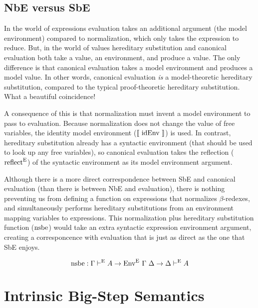 \documentclass{llncs}
\newcommand{\refsec}[1]{Section \ref{sec:#1}}
\def\marr{\rightarrow}
\def\reflecte{\fun{reflect}^\con{E}}
\def\nsbe{\fun{nsbe}}
\def\midenv{\el{\fun{idEnv}}}
\newcommand{\turn}[1]{\vdash^\con{#1}}
\newcommand{\el}[1]{\llbracket ~ #1 ~ \rrbracket}
\newcommand{\con}[1]{\textmd{#1}}
\newcommand{\fun}[1]{\textmd{#1}}
\newcommand{\type}[1]{\Gamma \turn{E} #1}
\newcommand{\dtype}[1]{\Delta \turn{E} #1}
\def\enve{\fun{Env}^\con{E}~\Gamma~\Delta}
\begin{document}
\subsection{NbE versus SbE}

In the world of expressions
evaluation takes an additional argument (the model environment) compared
to normalization, which only takes the expression to reduce. But, in
the world of values hereditary substitution and canonical evaluation
both take a value, an environment, and produce a value. The only
difference is that canonical evaluation takes a model environment and
produces a model value. 
In other words, canonical evaluation \textit{is}
a model-theoretic hereditary substitution, compared to the typical
proof-theoretic hereditary substitution.
What a beautiful coincidence!

A consequence of this is that normalization must invent a model
environment to pass to evaluation. Because normalization does not
change the value of free variables, the identity model environment
($\midenv$) is used. In contrast, hereditary substitution already has
a syntactic environment (that should be used to look up any free
variables), so canonical evaluation takes the 
reflection ($\reflecte$) of the syntactic environment as its model
environment argument.

Although there is a more direct correspondence between SbE and canonical
evaluation (than there is between NbE and evaluation), there is
nothing preventing us from defining a function on expressions that
normalizes $\beta$-redexes, and simultaneously performs hereditary
substitutions from an environment mapping variables to expressions.
This normalization plus hereditary substitution function ($\nsbe$) would take an
extra syntactic expression environment argument, creating a
corresponcence with evaluation that is just as direct as the one that
SbE enjoys.

$$
\nsbe : \type{A} \marr \enve \marr \dtype{A}
$$


\section{Intrinsic Big-Step Semantics}
\label{sec:emod}


\end{document}
